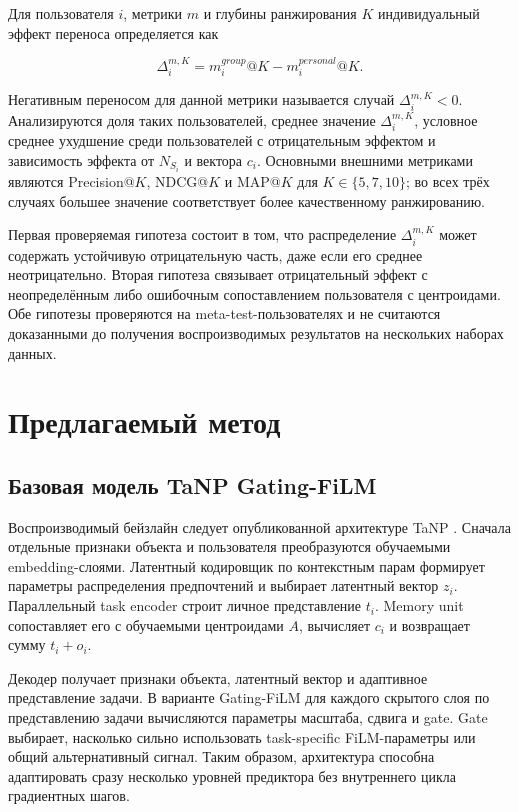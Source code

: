 \documentclass[12pt,a4paper]{article}
\begin{document}
Для пользователя $i$, метрики $m$ и глубины ранжирования $K$ индивидуальный
эффект переноса определяется как

\[
\Delta_i^{m,K}=m_i^{group}@K-m_i^{personal}@K.
\]

Негативным переносом для данной метрики называется случай
$\Delta_i^{m,K}<0$. Анализируются доля таких пользователей, среднее значение
$\Delta_i^{m,K}$, условное среднее ухудшение среди пользователей с
отрицательным эффектом и зависимость эффекта от $N_{S_i}$ и вектора $c_i$.
Основными внешними метриками являются Precision@$K$, NDCG@$K$ и MAP@$K$ для
$K\in\{5,7,10\}$; во всех трёх случаях большее значение соответствует более
качественному ранжированию.

Первая проверяемая гипотеза состоит в том, что распределение
$\Delta_i^{m,K}$ может содержать устойчивую отрицательную часть, даже если
его среднее неотрицательно. Вторая гипотеза связывает отрицательный эффект с
неопределённым либо ошибочным сопоставлением пользователя с центроидами. Обе
гипотезы проверяются на meta-test-пользователях и не считаются доказанными до
получения воспроизводимых результатов на нескольких наборах данных.

\section{Предлагаемый метод}

\subsection{Базовая модель TaNP Gating-FiLM}

Воспроизводимый бейзлайн следует опубликованной архитектуре TaNP
\citep{lin2021tanp}. Сначала отдельные признаки объекта и пользователя
преобразуются обучаемыми embedding-слоями. Латентный кодировщик по контекстным
парам формирует параметры распределения предпочтений и выбирает латентный
вектор $z_i$. Параллельный task encoder строит личное представление $t_i$.
Memory unit сопоставляет его с обучаемыми центроидами $A$, вычисляет $c_i$ и
возвращает сумму $t_i+o_i$.

Декодер получает признаки объекта, латентный вектор и адаптивное представление
задачи. В варианте Gating-FiLM для каждого скрытого слоя по представлению
задачи вычисляются параметры масштаба, сдвига и gate. Gate выбирает, насколько
сильно использовать task-specific FiLM-параметры или общий альтернативный
сигнал. Таким образом, архитектура способна адаптировать сразу несколько
уровней предиктора без внутреннего цикла градиентных шагов.
\end{document}
